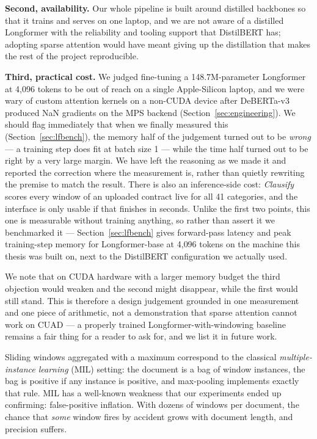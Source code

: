 \textbf{Second, availability.} Our whole pipeline is built around distilled backbones so that it trains and serves on one laptop, and we are not aware of a distilled Longformer with the reliability and tooling support that DistilBERT has; adopting sparse attention would have meant giving up the distillation that makes the rest of the project reproducible.

\textbf{Third, practical cost.} We judged fine-tuning a 148.7M-parameter Longformer at 4{,}096 tokens to be out of reach on a single Apple-Silicon laptop, and we were wary of custom attention kernels on a non-CUDA device after DeBERTa-v3 produced NaN gradients on the MPS backend (Section~\ref{sec:engineering}). We should flag immediately that when we finally measured this (Section~\ref{sec:lfbench}), the memory half of the judgement turned out to be \emph{wrong} --- a training step does fit at batch size 1 --- while the time half turned out to be right by a very large margin. We have left the reasoning as we made it and reported the correction where the measurement is, rather than quietly rewriting the premise to match the result. There is also an inference-side cost: \emph{Clausify} scores every window of an uploaded contract live for all 41 categories, and the interface is only usable if that finishes in seconds. Unlike the first two points, this one is measurable without training anything, so rather than assert it we benchmarked it --- Section~\ref{sec:lfbench} gives forward-pass latency and peak training-step memory for Longformer-base at 4{,}096 tokens on the machine this thesis was built on, next to the DistilBERT configuration we actually used.

We note that on CUDA hardware with a larger memory budget the third objection would weaken and the second might disappear, while the first would still stand. This is therefore a design judgement grounded in one measurement and one piece of arithmetic, not a demonstration that sparse attention cannot work on CUAD --- a properly trained Longformer-with-windowing baseline remains a fair thing for a reader to ask for, and we list it in future work.

Sliding windows aggregated with a maximum correspond to the classical \emph{multiple-instance learning} (MIL) setting: the document is a bag of window instances, the bag is positive if any instance is positive, and max-pooling implements exactly that rule. MIL has a well-known weakness that our experiments ended up confirming: false-positive inflation. With dozens of windows per document, the chance that \emph{some} window fires by accident grows with document length, and precision suffers.

